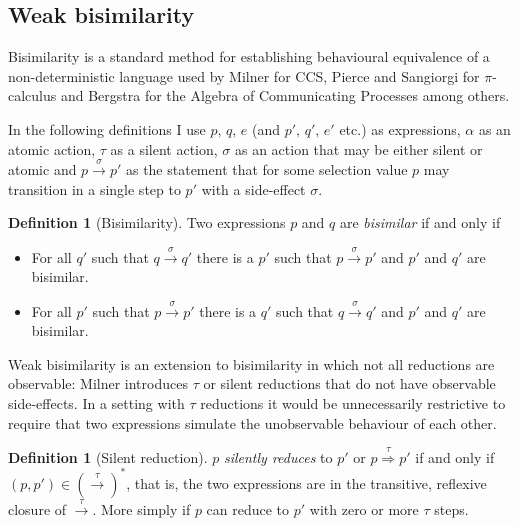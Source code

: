 \documentclass[12pt,twoside,notitlepage]{report}
\theoremstyle{plain}%
\theoremstyle{definition}
\newtheorem{defn}[thm]{Definition}
\theoremstyle{remark}
\begin{document}
\subsection{Weak bisimilarity}
Bisimilarity is a standard method for establishing behavioural equivalence of a non-deterministic language used by Milner for CCS\cite{milner1982calculus}, Pierce and Sangiorgi for $ \pi $-calculus\cite{pierce2000behavioral} and Bergstra for the Algebra of Communicating Processes\cite{bergstra1986algebra,bergstra1985algebra} among others. 

In the following definitions I use $ p,\, q,\, e $ (and $ p',\,q',\, e' $ etc.) as expressions, $ \alpha $ as an atomic action, $ \tau $ as a silent action, $ \sigma $ as an action that may be either silent or atomic and $ p \overset{\sigma}{\rightarrow} p' $ as the statement that for some selection value $ p $ may transition in a single step to $ p' $ with a side-effect $ \sigma $.

\begin{defn}[Bisimilarity]
Two expressions $ p $ and $ q $ are \textit{bisimilar} if and only if
\begin{itemize}
\item{For all $ q' $ such that $ q \overset{\sigma}{\rightarrow} q' $ there is a $ p' $ such that $ p \overset{\sigma}{\rightarrow} p' $ and $ p' $ and $ q' $ are bisimilar. }
\item{For all $ p' $ such that $ p \overset{\sigma}{\rightarrow} p' $ there is a $ q' $ such that $ q \overset{\sigma}{\rightarrow} q' $ and $ p' $ and $ q' $ are bisimilar. }
\end{itemize}
\end{defn}

Weak bisimilarity is an extension to bisimilarity in which not all reductions are observable: Milner\cite{milner1982calculus} introduces $ \tau $ or silent reductions that do not have observable side-effects. In a setting with $ \tau $ reductions it would be unnecessarily restrictive to require that two expressions simulate the unobservable behaviour of each other. 

\begin{defn}[Silent reduction]
$ p $ \textit{silently reduces} to $ p' $ or $ p \overset{\tau}{\Rightarrow} p' $ if and only if $ (p, p') \in \left(\overset{\tau}{\rightarrow}\right)^* $, that is, the two expressions are in the transitive, reflexive closure of $ \overset{\tau}{\rightarrow} $. More simply if $ p $ can reduce to $ p' $ with zero or more $ \tau $ steps.
\end{defn}
\end{document}
